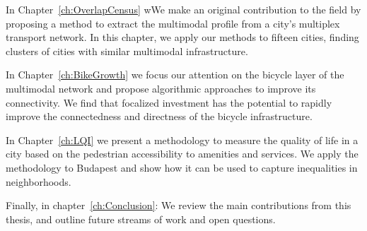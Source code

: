 In Chapter~\ref{ch:OverlapCensus} wWe make an original contribution to the field by proposing a method to extract the multimodal profile from a city's multiplex transport network. In this chapter, we apply our methods to fifteen cities, finding clusters of cities with similar multimodal infrastructure.

In Chapter~\ref{ch:BikeGrowth} we focus our attention on the bicycle layer of the multimodal network and propose algorithmic approaches to improve its connectivity. We find that focalized investment has the potential to rapidly improve the connectedness and directness of the bicycle infrastructure.

In Chapter~\ref{ch:LQI} we present a methodology to measure the quality of life in a city based on the pedestrian accessibility to amenities and services. We apply the methodology to Budapest and show how it can be used to capture inequalities in neighborhoods.

Finally, in chapter~\ref{ch:Conclusion}: We review the main contributions from this thesis, and outline future streams of work and open questions. 